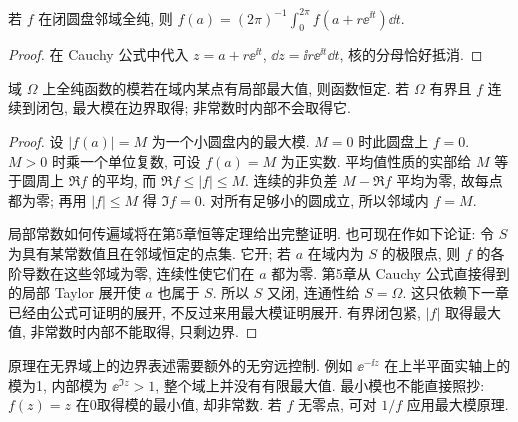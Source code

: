 \begin{proposition}[平均值性质]
若 $f$ 在闭圆盘邻域全纯, 则 $f(a)=(2\pi)^{-1}\int_0^{2\pi}f(a+r\ee^{\ii t})\dd t$.
\end{proposition}
\begin{proof}
在 Cauchy 公式中代入 $z=a+r\ee^{\ii t}$, $\dd z=\ii r\ee^{\ii t}\dd t$, 核的分母恰好抵消.
\end{proof}
\begin{theorem}[最大模原理]\label{thm:maxmod}
域 $\Omega$ 上全纯函数的模若在域内某点有局部最大值, 则函数恒定. 若 $\Omega$ 有界且 $f$ 连续到闭包, 最大模在边界取得; 非常数时内部不会取得它.
\end{theorem}
\begin{proof}
设 $|f(a)|=M$ 为一个小圆盘内的最大模. $M=0$ 时此圆盘上 $f=0$. $M>0$ 时乘一个单位复数, 可设 $f(a)=M$ 为正实数. 平均值性质的实部给 $M$ 等于圆周上 $\Re f$ 的平均, 而 $\Re f\le |f|\le M$. 连续的非负差 $M-\Re f$ 平均为零, 故每点都为零; 再用 $|f|\le M$ 得 $\Im f=0$. 对所有足够小的圆成立, 所以邻域内 $f=M$.

局部常数如何传遍域将在第5章恒等定理给出完整证明. 也可现在作如下论证: 令 $S$ 为具有某常数值且在邻域恒定的点集. 它开; 若 $a$ 在域内为 $S$ 的极限点, 则 $f$ 的各阶导数在这些邻域为零, 连续性使它们在 $a$ 都为零. 第5章从 Cauchy 公式直接得到的局部 Taylor 展开使 $a$ 也属于 $S$. 所以 $S$ 又闭, 连通性给 $S=\Omega$. 这只依赖下一章已经由公式可证明的展开, 不反过来用最大模证明展开. 有界闭包紧, $|f|$ 取得最大值, 非常数时内部不能取得, 只剩边界.
\end{proof}
原理在无界域上的边界表述需要额外的无穷远控制. 例如 $\ee^{-\ii z}$ 在上半平面实轴上的模为1, 内部模为 $\ee^{\Im z}>1$, 整个域上并没有有限最大值. 最小模也不能直接照抄: $f(z)=z$ 在0取得模的最小值, 却非常数. 若 $f$ 无零点, 可对 $1/f$ 应用最大模原理.

